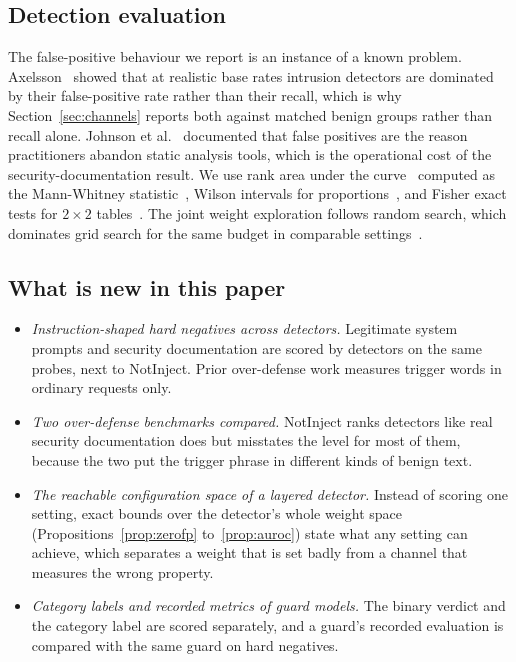 \documentclass[conference]{IEEEtran}
\begin{document}
\subsection{Detection evaluation}
The false-positive behaviour we report is an instance of a known problem.
Axelsson~\cite{axelsson2000baserate} showed that at realistic base rates
intrusion detectors are dominated by their false-positive rate rather than
their recall, which is why Section~\ref{sec:channels} reports both against
matched benign groups rather than recall alone. Johnson et
al.~\cite{johnson2013static} documented that false positives are the reason
practitioners abandon static analysis tools, which is the operational cost of
the security-documentation result. We use rank area under the
curve~\cite{fawcett2006introduction} computed as the Mann-Whitney
statistic~\cite{mann1947test}, Wilson intervals for
proportions~\cite{wilson1927interval}, and Fisher exact tests for $2\times2$
tables~\cite{fisher1922interpretation}. The joint weight exploration follows
random search, which dominates grid search for the same
budget in comparable settings~\cite{bergstra2012random}.

\subsection{What is new in this paper}\label{sec:novelty}

\begin{itemize}
\item \emph{Instruction-shaped hard negatives across detectors.} Legitimate
  system prompts and security documentation are scored by \NDetectorsCompared{}
  detectors on the same probes, next to NotInject. Prior over-defense work
  measures trigger words in ordinary requests only.
\item \emph{Two over-defense benchmarks compared.} NotInject ranks detectors
  like real security documentation does but misstates the level for most of
  them, because the two put the trigger phrase in different kinds of benign
  text.
\item \emph{The reachable configuration space of a layered detector.} Instead of
  scoring one setting, exact bounds over the detector's whole weight space
  (Propositions~\ref{prop:zerofp} to~\ref{prop:auroc}) state what any setting
  can achieve, which separates a weight that is set badly from a channel that
  measures the wrong property.
\item \emph{Category labels and recorded metrics of guard models.} The binary
  verdict and the category label are scored separately, and a guard's recorded
  evaluation is compared with the same guard on hard negatives.
\end{itemize}
\end{document}
